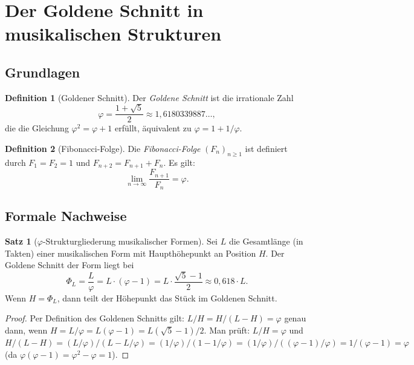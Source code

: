 ﻿\documentclass[a4paper,12pt]{article}
\theoremstyle{definition}
\newtheorem{definition}{Definition}
\newtheorem{satz}{Satz}
\begin{document}
\section{Der Goldene Schnitt in musikalischen Strukturen}

\subsection{Grundlagen}

\begin{definition}[Goldener Schnitt]
Der \emph{Goldene Schnitt} ist die irrationale Zahl
\[
\varphi = \frac{1 + \sqrt{5}}{2} \approx 1{,}6180339887\ldots,
\]
die die Gleichung $\varphi^2 = \varphi + 1$ erfüllt, äquivalent zu
$\varphi = 1 + 1/\varphi$.
\end{definition}

\begin{definition}[Fibonacci-Folge]
Die \emph{Fibonacci-Folge} $(F_n)_{n \geq 1}$ ist definiert durch
$F_1 = F_2 = 1$ und $F_{n+2} = F_{n+1} + F_n$. Es gilt:
\[
\lim_{n \to \infty} \frac{F_{n+1}}{F_n} = \varphi.
\]
\end{definition}

\subsection{Formale Nachweise}

\begin{satz}[$\varphi$-Strukturgliederung musikalischer Formen]
\label{satz:phi_form}
Sei $L$ die Gesamtlänge (in Takten) einer musikalischen Form mit Haupthöhepunkt
an Position $H$. Der Goldene Schnitt der Form liegt bei
\[
\Phi_L = \frac{L}{\varphi} = L \cdot (\varphi - 1) = L \cdot \frac{\sqrt{5}-1}{2} \approx 0{,}618 \cdot L.
\]
Wenn $H = \Phi_L$, dann teilt der Höhepunkt das Stück im Goldenen Schnitt.
\end{satz}

\begin{proof}
Per Definition des Goldenen Schnitts gilt: $L/H = H/(L-H) = \varphi$
genau dann, wenn $H = L/\varphi = L(\varphi-1) = L(\sqrt{5}-1)/2$.
Man prüft: $L/H = \varphi$ und $H/(L-H) = (L/\varphi)/(L-L/\varphi)
= (1/\varphi)/(1-1/\varphi) = (1/\varphi)/(({\varphi-1})/\varphi)
= 1/(\varphi-1) = \varphi$ (da $\varphi(\varphi-1) = \varphi^2-\varphi = 1$).
\end{proof}
\end{document}
